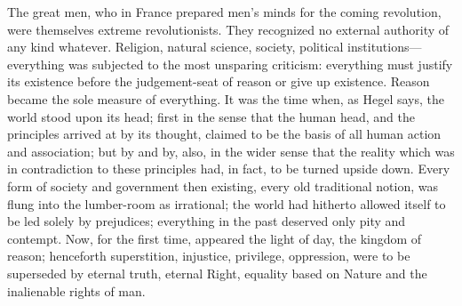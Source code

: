 The great men, who in France prepared men's minds for the coming revolution,
were themselves extreme revolutionists. They recognized no external authority of
any kind whatever. Religion, natural science, society, political
institutions---everything was subjected to the most unsparing criticism:
everything must justify its existence before the judgement-seat of reason or
give up existence. Reason became the sole measure of everything. It was the time
when, as Hegel says, the world stood upon its head; first in the sense that the human head, and the principles arrived at by its
thought, claimed to be the basis of all human action and association; but by
and by, also, in the wider sense that the reality which was in contradiction to
these principles had, in fact, to be turned upside down. Every form of society
and government then existing, every old traditional notion, was flung into the
lumber-room as irrational; the world had hitherto allowed itself to be led
solely by prejudices; everything in the past deserved only pity and contempt.
Now, for the first time, appeared the light of day, the kingdom of reason;
henceforth superstition, injustice, privilege, oppression, were to be superseded
by eternal truth, eternal Right, equality based on Nature and the inalienable
rights of man.

